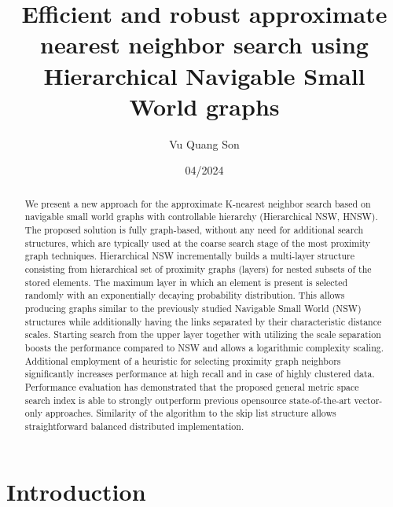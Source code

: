 \documentclass{article}
\title{Efficient and robust approximate nearest neighbor search using Hierarchical Navigable Small World graphs}
\author{Vu Quang Son}
\date{04/2024}
\begin{document}
\maketitle

\begin{abstract}
    We present a new approach for the approximate K-nearest neighbor search based on navigable small world
graphs with controllable hierarchy (Hierarchical NSW, HNSW). The proposed solution is fully graph-based, without any need for
additional search structures, which are typically used at the coarse search stage of the most proximity graph techniques.
Hierarchical NSW incrementally builds a multi-layer structure consisting from hierarchical set of proximity graphs (layers) for
nested subsets of the stored elements. The maximum layer in which an element is present is selected randomly with an
exponentially decaying probability distribution. This allows producing graphs similar to the previously studied Navigable Small
World (NSW) structures while additionally having the links separated by their characteristic distance scales. Starting search
from the upper layer together with utilizing the scale separation boosts the performance compared to NSW and allows a
logarithmic complexity scaling. Additional employment of a heuristic for selecting proximity graph neighbors significantly
increases performance at high recall and in case of highly clustered data. Performance evaluation has demonstrated that the
proposed general metric space search index is able to strongly outperform previous opensource state-of-the-art vector-only
approaches. Similarity of the algorithm to the skip list structure allows straightforward balanced distributed implementation.
\end{abstract}

\section{Introduction}
\end{document}
